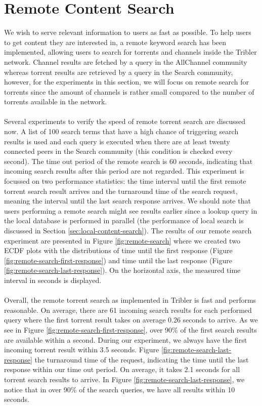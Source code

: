 \section{Remote Content Search}
\label{sec:remote-content-search-experiment}
We wish to serve relevant information to users as fast as possible. To help users to get content they are interested in, a remote keyword search has been implemented, allowing users to search for torrents and channels inside the Tribler network. Channel results are fetched by a query in the AllChannel community whereas torrent results are retrieved by a query in the Search community, however, for the experiments in this section, we will focus on remote search for torrents since the amount of channels is rather small compared to the number of torrents available in the network.\\\\
Several experiments to verify the speed of remote torrent search are discussed now. A list of 100 search terms that have a high chance of triggering search results is used and each query is executed when there are at least twenty connected peers in the Search community (this condition is checked every second). The time out period of the remote search is 60 seconds, indicating that incoming search results after this period are not regarded. This experiment is focussed on two performance statistics: the time interval until the first remote torrent search result arrives and the turnaround time of the search request, meaning the interval until the last search response arrives. We should note that users performing a remote search might see results earlier since a lookup query in the local database is performed in parallel (the performance of local search is discussed in Section \ref{sec:local-content-search}). The results of our remote search experiment are presented in Figure \ref{fig:remote-search} where we created two ECDF plots with the distributions of time until the first response (Figure \ref{fig:remote-search-first-response}) and time until the last response (Figure \ref{fig:remote-search-last-response}). On the horizontal axis, the measured time interval in seconds is displayed.\\\\
Overall, the remote torrent search as implemented in Tribler is fast and performs reasonable. On average, there are 61 incoming search results for each performed query where the first torrent result takes on average 0.26 seconds to arrive. As we see in Figure \ref{fig:remote-search-first-response}, over 90\% of the first search results are available within a second. During our experiment, we always have the first incoming torrent result within 3.5 seconds. Figure \ref{fig:remote-search-last-response} the turnaround time of the request, indicating the time until the last response within our time out period. On average, it takes 2.1 seconds for all torrent search results to arrive. In Figure \ref{fig:remote-search-last-response}, we notice that in over 90\% of the search queries, we have all results within 10 seconds.\\

